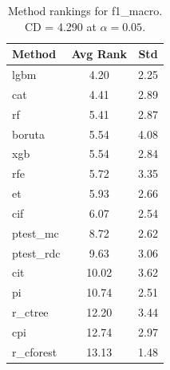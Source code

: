 \begin{table}[h]
\centering
\caption{Method rankings for f1_macro. CD = 4.290 at $\alpha=0.05$.}
\label{tab:ranks_f1_macro}
\begin{tabular}{lcc}
\toprule
Method & Avg Rank & Std \\
\midrule
lgbm & 4.20 & 2.25 \\
cat & 4.41 & 2.89 \\
rf & 5.41 & 2.87 \\
boruta & 5.54 & 4.08 \\
xgb & 5.54 & 2.84 \\
rfe & 5.72 & 3.35 \\
et & 5.93 & 2.66 \\
cif & 6.07 & 2.54 \\
ptest_mc & 8.72 & 2.62 \\
ptest_rdc & 9.63 & 3.06 \\
cit & 10.02 & 3.62 \\
pi & 10.74 & 2.51 \\
r_ctree & 12.20 & 3.44 \\
cpi & 12.74 & 2.97 \\
r_cforest & 13.13 & 1.48 \\
\bottomrule
\end{tabular}
\end{table}